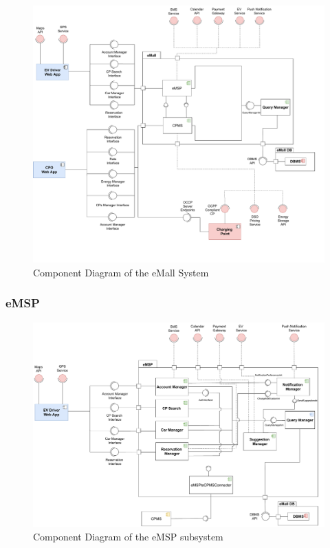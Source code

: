 \begin{figure}[H]
    \centering
    \hspace*{-2cm}
    \includegraphics[scale=0.5]{src/ComponentDiagram/overview_component_diagram.pdf}
    \caption{Component Diagram of the eMall System}
\end{figure}


\subsubsection{eMSP}

\begin{figure}[H]
    \centering
    \hspace*{-2cm}
    \includegraphics[scale=0.5]{src/ComponentDiagram/emsp_component_diagram.pdf}
    \caption{Component Diagram of the eMSP subsystem}
\end{figure}

